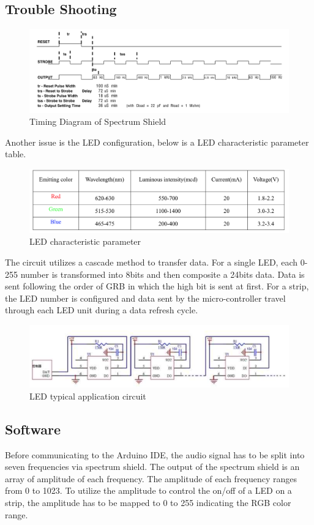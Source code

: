 \documentclass[12pt,a4paper,journal]{IEEEtran}
\begin{document}
\subsection{Trouble Shooting}
\begin{figure}
  \centering
  \includegraphics[width=0.9\linewidth]{timing1.png}
  \caption{Timing Diagram of Spectrum Shield}
  \label{fig:sstd1}
\end{figure}
Another issue is the LED configuration, below is a LED characteristic parameter table.
\begin{figure}
  \centering
  \includegraphics[width=0.9\linewidth]{ledparameter.png}
  \caption{LED characteristic parameter}
  \label{fig:ledcp}
\end{figure}
The circuit utilizes a cascade method to transfer data. For a single LED, each 0-255 number is transformed into 8bits and then composite a 24bits data. Data is sent following the order of GRB in which the high bit is sent at first. For a strip, the LED number is configured and data sent by the micro-controller travel through each LED unit during a data refresh cycle.
\begin{figure}
  \centering
  \includegraphics[width=0.9\linewidth]{ledcircuit.png}
  \caption{LED typical application circuit}
  \label{fig:ledtac}
\end{figure}
\subsection{Software}
Before communicating to the Arduino IDE, the audio signal has to be split into seven frequencies via spectrum shield. The output of the spectrum shield is an array of amplitude of each frequency. The amplitude of each frequency ranges from 0 to 1023. To utilize the amplitude to control the on/off of a LED on a strip, the amplitude has to be mapped to 0 to 255 indicating the RGB color range.
\end{document}
